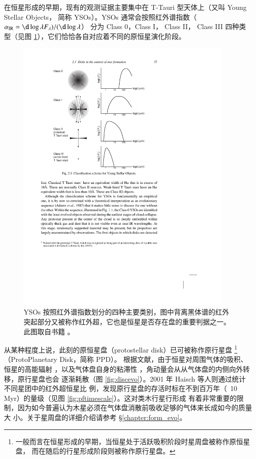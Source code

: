 在恒星形成的早期，现有的观测证据主要集中在 T-Tauri 型天体上（又叫 Young Stellar Objects，
简称 YSOs）。YSOs 通常会按照红外谱指数（$\alpha_\tif{IR} = \d\log \lambda F_\lambda)/(\d\log \lambda$）
分为 Class 0，Class \RN{1}， Class \RN{2}， Class \RN{3} 四种类型\cite{Andreetal2000}（见图
 \ref{fig:ysostage}），它们恰恰各自对应着不同的原恒星演化阶段。

\begin{figure}[t]
\centering
\includegraphics[width=0.95\textwidth]{figures/chapter1/fig9_ysostages.pdf}
\caption[YSOs 按照红外谱指数划分的四种主要类别，版权所有：Armitage P.。]{YSOs 按照红外谱指数划分的四种主要类别，图中背离黑体谱的红外突起部分又被称作红外超，它也是恒星是否存在盘的重要判据之一。此图取自书籍 。}
\label{fig:ysostage}
\end{figure}

从某种程度上说，此刻的原恒星盘（protostellar disk）已可被称作原行星盘
\footnote{一般而言在恒星形成的早期，当恒星处于活跃吸积阶段时星周盘被称作原恒星盘，
而在随后的行星形成阶段则被称作原行星盘。}（ProtoPlanetary Disk，简称 PPD）。
根据文献，由于恒星对周围气体的吸积\cite{Pringle1981}、恒星的高能辐射
\cite{Johnstone1998,Hollenbach1994}，以及气体盘自身的粘滞性
\cite{Shakura1973,Gammie1996}，角动量会从从气体盘的内侧向外转移，原行星盘也会
逐渐耗散（图 \ref{fig:discevo}）。2001 年 Haisch 等人则通过统计不同星团中的红外超恒星比
例\cite{Haisch2001}，发现原行星盘的存活时标在不到百万年（~10 Myr）的量级（见图 \ref{fig:pftimescale}）。这对类木行星行形成
有着非常重要的限制，因为如今普遍认为木星必须在气体盘消散前吸收足够的气体来长成如今的质量大
小\cite{WilliamsCieza2011}。关于星周盘的详细介绍请参考 \S \ref{chapter:form_evo}。

